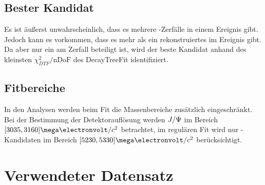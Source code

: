 \subsection{Bester Kandidat}
Es ist äußerst unwahrscheinlich, dass es mehrere \Decaychannel-Zerfälle in einem Ereignis gibt. Jedoch kann es vorkommen, dass es mehr als ein rekonstruiertes \Bd im Ereignis gibt. Da aber nur ein \Bd am Zerfall beteiligt ist, wird der beste Kandidat anhand des kleinsten $\chi^2_{DTF}/\text{nDoF}$ des DecayTreeFit identifiziert. \cite{lhcb-paper}

\subsection{Fitbereiche}
In den Analysen werden beim Fit die Massenbereiche zusätzlich eingeschränkt. Bei der Bestimmung der Detektorauflösung werden $J/\Psi$ im Bereich $[3035, 3160]\mega\electronvolt/c^2$ betrachtet, im regulären Fit wird nur \Bd-Kandidaten im Bereich $[5230, 5330]\mega\electronvolt/c^2$ berücksichtigt.

\section{Verwendeter Datensatz}
